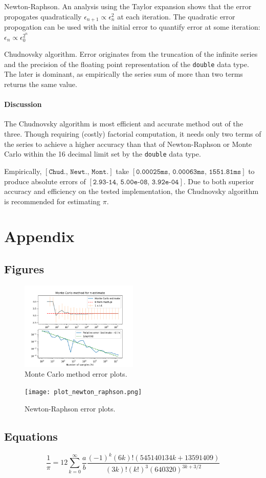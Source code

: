 \documentclass[11pt]{article}
\begin{document}
\par{Newton-Raphson.} An analysis using the Taylor expansion shows that the error propogates quadratically $\epsilon_{n+1}\propto \epsilon_n^2$
at each iteration.\cite{newton:err} The quadratic error propogation can be used with the initial error to quantify error at some iteration: $\epsilon_{n} \propto \epsilon_{0}^{2^{n}}$

\par{Chudnovsky algorithm.} Error originates from the truncation of the infinite series and the precision of the floating point 
representation of the \texttt{double} data type. The later is dominant, as empirically the series sum of more than two terms
returns the same value.

\paragraph{Discussion} The Chudnovsky algorithm is most efficient and accurate method out of the three. Though requiring 
(costly) factorial computation, it needs only two terms of the series to achieve a
higher accuracy than that of Newton-Raphson or Monte Carlo within the 16 decimal limit set by the \texttt{double} data type.
\par Empirically, $[\texttt{Chud., Newt., Mont.}]$
take $[\texttt{0.00025ms, 0.00063ms, 1551.81ms}]$ to produce absolute errors of $[\texttt{2.93-14, 5.00e-08, 3.92e-04}]$.
Due to both superior accuracy and efficiency on the tested implementation, the Chudnovsky algorithm is recommended for estimating $\pi$.

\newpage
\thispagestyle{empty}
\section*{Appendix}
\subsection*{Figures}
\begin{figure}[h!]
    \centering
    \includegraphics[width=0.5\textwidth]{monte_carlo_plot.png}
    \caption{Monte Carlo method error plots.}
    \label{fig:monte_carlo_plot}
\end{figure}
\begin{figure}[h]
    \centering
    \texttt{[image: plot\_newton\_raphson.png]}
    \caption{Newton-Raphson error plots.}
    \label{fig:newton-raphson_plot}
\end{figure}
\subsection*{Equations}
\begin{equation}
    \label{eq:chudnovsky}
    \frac{1}{\pi} =  12\sum_{k=0}^{\infty}\frac{a}{b} \frac{(-1)^k(6k)!(545140134k+13591409)}{(3k)!(k!)^3(640320)^{3k+3/2}}
\end{equation}

\printbibliography
\end{document}
